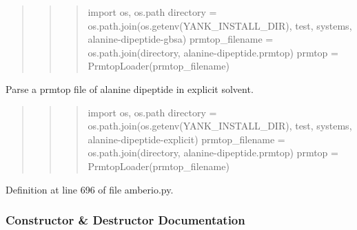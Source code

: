 \begin{quote}
\begin{quote}
\begin{quote}
import os, os.\+path directory = os.\+path.\+join(os.\+getenv(\textquotesingle{}Y\+A\+N\+K\+\_\+\+I\+N\+S\+T\+A\+L\+L\+\_\+\+D\+IR\textquotesingle{}), \textquotesingle{}test\textquotesingle{}, \textquotesingle{}systems\textquotesingle{}, \textquotesingle{}alanine-\/dipeptide-\/gbsa\textquotesingle{}) prmtop\+\_\+filename = os.\+path.\+join(directory, \textquotesingle{}alanine-\/dipeptide.\+prmtop\textquotesingle{}) prmtop = Prmtop\+Loader(prmtop\+\_\+filename) \end{quote}
\end{quote}
\end{quote}
\begin{DoxyVerb} Parse a prmtop file of alanine dipeptide in explicit solvent.
\end{DoxyVerb}


\begin{quote}
\begin{quote}
\begin{quote}
import os, os.\+path directory = os.\+path.\+join(os.\+getenv(\textquotesingle{}Y\+A\+N\+K\+\_\+\+I\+N\+S\+T\+A\+L\+L\+\_\+\+D\+IR\textquotesingle{}), \textquotesingle{}test\textquotesingle{}, \textquotesingle{}systems\textquotesingle{}, \textquotesingle{}alanine-\/dipeptide-\/explicit\textquotesingle{}) prmtop\+\_\+filename = os.\+path.\+join(directory, \textquotesingle{}alanine-\/dipeptide.\+prmtop\textquotesingle{}) prmtop = Prmtop\+Loader(prmtop\+\_\+filename) \end{quote}
\end{quote}
\end{quote}


Definition at line 696 of file amberio.\+py.



\subsubsection{Constructor \& Destructor Documentation}
\mbox{\label{classsrc_1_1amberio_1_1PrmtopLoader_a5090d17f6ee0ee8f323b1b3c5ee68181}} 
